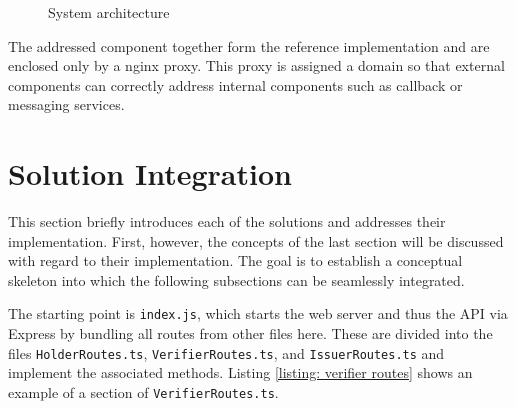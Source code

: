     \begin{figure}[ht]
        \centering
        \caption{System architecture}
        \label{figure: sys architecture}
    \end{figure}
    
    The addressed component together form the reference implementation and are enclosed only by a nginx proxy. This proxy is assigned a domain so that external components can correctly address internal components such as callback or messaging services. 
    
    \section{Solution Integration}\label{section: integration}
    
    This section briefly introduces each of the solutions and addresses their implementation. First, however, the concepts of the last section will be discussed with regard to their implementation. The goal is to establish a conceptual skeleton into which the following subsections can be seamlessly integrated.
    
    The starting point is \texttt{index.js}, which starts the web server and thus the API via Express by bundling all routes from other files here. These are divided into the files \texttt{HolderRoutes.ts}, \texttt{VerifierRoutes.ts}, and \texttt{IssuerRoutes.ts} and implement the associated methods. Listing \ref{listing: verifier routes} shows an example of a section of \texttt{VerifierRoutes.ts}.
    \newline

